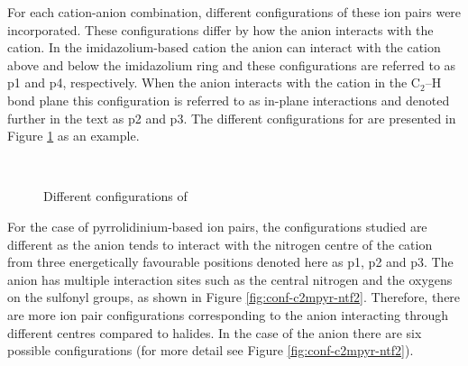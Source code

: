 For each cation-anion combination, different configurations of these ion pairs were incorporated. 
These configurations differ by how the anion interacts with the cation. 
In the imidazolium-based cation  the anion can interact with the cation above and below the imidazolium ring and these configurations are referred to as p1 and p4, respectively.
When the anion interacts with the cation in the $\text{C}_2\text{--H}$ bond plane this configuration is referred to as in-plane interactions and denoted further in the text as p2 and p3.
The different configurations for  are presented in Figure
\protect\ref{fig:conf-c3mim-br}
as an example. 


\begin{figure}
    \centering
    \mbox{
    }
    \mbox{
    }                                 
    \caption{Different configurations of \protect{} \label{fig:conf-c3mim-br}}
\end{figure}

For the case of pyrrolidinium-based ion pairs, the configurations studied are different as the anion tends to interact with the nitrogen centre of the cation from three energetically favourable positions denoted here as p1, p2 and p3.
\cite{Izgorodina2014a}
The \ntf anion has multiple interaction sites such as the central nitrogen and the oxygens on the sulfonyl groups, as shown in Figure \ref{fig:conf-c2mpyr-ntf2}.
Therefore, there are more ion pair configurations corresponding to the anion interacting through different centres compared to halides.
In the case of the \ntf anion there are six possible configurations (for more detail see Figure \ref{fig:conf-c2mpyr-ntf2}). 


